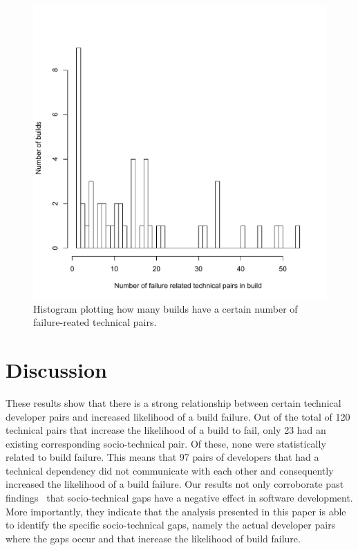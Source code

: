 \begin{figure}[t]
\centering
\vspace{-1cm}
\includegraphics[width=\columnwidth]{figures/builddistribution}
\vspace{-.75cm}
\caption{Histogram plotting how many builds have a certain number of failure-reated technical pairs.}
\label{fig:builddistribution}
\end{figure}

\section{Discussion}
\label{ch8:dis}
These results show that there is a strong relationship between certain technical
developer pairs and increased likelihood of a build failure.
Out of the total of 120 technical pairs that increase the likelihood of a
build to fail, only 23 had an existing
corresponding socio-technical pair. Of these, none were statistically
related to build failure. This means that 97 pairs of developers that had a
technical dependency did not communicate with each other and
consequently increased the likelihood of a build failure. Our results not only
corroborate past findings~\cite{cataldo:cscw:2006,cataldo:esem:2008} that socio-technical gaps
have a negative effect in software development. More importantly, they indicate
that the analysis presented in this paper is able to identify the specific
socio-technical gaps, namely the actual developer pairs where the gaps occur
and that increase the likelihood of build failure. 

